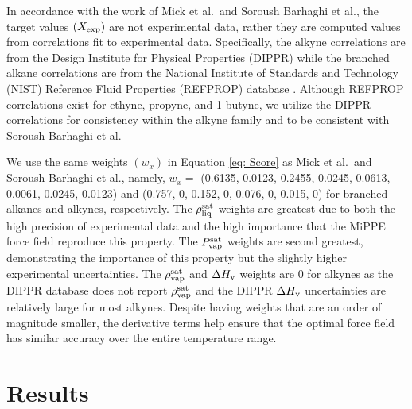 \documentclass[journal=jced,manuscript=article]{achemso}
\begin{document}
In accordance with the work of Mick et al.\cite{Potoff_branched}~and Soroush Barhaghi et al.\cite{Barhaghi2017}, the target values $(X_{\rm exp})$ are not experimental data, rather they are computed values from correlations fit to experimental data. Specifically, the alkyne correlations are from the Design Institute for Physical Properties (DIPPR) \cite{DIPPR} while the branched alkane correlations are from the National Institute of Standards and Technology (NIST) Reference Fluid Properties (REFPROP) database \cite{LEMMON-RP10}. Although REFPROP correlations exist for ethyne, propyne, and 1-butyne, we utilize the DIPPR correlations for consistency within the alkyne family and to be consistent with Soroush Barhaghi et al.  

We use the same weights $(w_x)$ in Equation \ref{eq: Score} as Mick et al.\cite{Potoff_branched}~and Soroush Barhaghi et al.\cite{Barhaghi2017}, namely, $w_x =$ (0.6135, 0.0123, 0.2455, 0.0245, 0.0613, 0.0061, 0.0245, 0.0123) and (0.757, 0, 0.152, 0, 0.076, 0, 0.015, 0) for branched alkanes and alkynes, respectively. The $\rho_{\rm liq}^{\rm sat}$ weights are greatest due to both the high precision of experimental data and the high importance that the MiPPE force field reproduce this property. The $P_{\rm vap}^{\rm sat}$ weights are second greatest, demonstrating the importance of this property but the slightly higher experimental uncertainties. The $\rho_{\rm vap}^{\rm sat}$ and $\Delta H_{\rm v}$ weights are 0 for alkynes as the DIPPR database does not report $\rho_{\rm vap}^{\rm sat}$ and the DIPPR $\Delta H_{\rm v}$ uncertainties are relatively large for most alkynes. Despite having weights that are an order of magnitude smaller, the derivative terms help ensure that the optimal force field has similar accuracy over the entire temperature range. 


\section{Results} \label{sec: Results}
\end{document}
